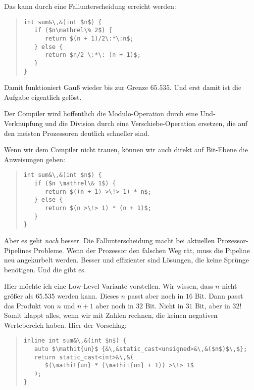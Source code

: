 \documentclass[a5paper,landscape,ngerman,10pt]{article}
\begin{document}
Das kann durch eine Fallunterscheidung erreicht werden:

\begin{quotation}
\begin{lstlisting}
int sum&\,&(int $n$) {
   if ($n\mathrel\% 2$) {
      return $(n + 1)/2\:*\:n$;
   } else {
      return $n/2 \:*\: (n + 1)$;
   }
}
\end{lstlisting}
\end{quotation}

Damit funktioniert Gauß wieder bis zur Grenze $65.535$.
Und erst damit ist die Aufgabe eigentlich gelöst.

Der Compiler wird hoffentlich die Modulo-Operation durch eine
Und-Verknüpfung und die Division durch eine
Verschiebe-Operation ersetzen, die auf den meisten
Prozessoren deutlich schneller sind.

Wenn wir dem Compiler nicht trauen, können wir auch direkt
auf Bit-Ebene die Anweisungen geben:

\begin{quotation}
\begin{lstlisting}
int sum&\,&(int $n$) {
   if ($n \mathrel\& 1$) {
      return $((n + 1) >\!> 1) * n$;
   } else {
      return $(n >\!> 1) * (n + 1)$;
   }
}
\end{lstlisting}
\end{quotation}

Aber es geht \textit{noch\/} besser.
Die Fallunterscheidung macht bei aktuellen Prozessor-Pipelines
Probleme.
Wenn der Prozessor den falschen Weg rät, muss die
Pipeline neu angekurbelt werden.
Besser und effizienter sind Lösungen, die keine
Sprünge benötigen.
Und die gibt es.

Hier möchte ich eine Low-Level Variante vorstellen.
Wir wissen, dass $n$ nicht größer als $65.535$ werden
kann.
Dieses $n$ passt aber noch in $16$ Bit.
Dann passt das Produkt von $n$ und $n+1$ aber noch in
$32$ Bit.
Nicht in $31$ Bit, aber in $32$!
Somit klappt alles, wenn wir mit Zahlen rechnen, die
keinen negativen Wertebereich haben.
Hier der Vorschlag:

\begin{quotation}
\begin{lstlisting}
inline int sum&\,&(int $n$) {
   auto $\mathit{un}$ {&\,&static_cast<unsigned>&\,&($n$)$\,$};
   return static_cast<int>&\,&(
      $(\mathit{un} * (\mathit{un} + 1)) >\!> 1$
   );
}
\end{lstlisting}
\end{quotation}
\end{document}
